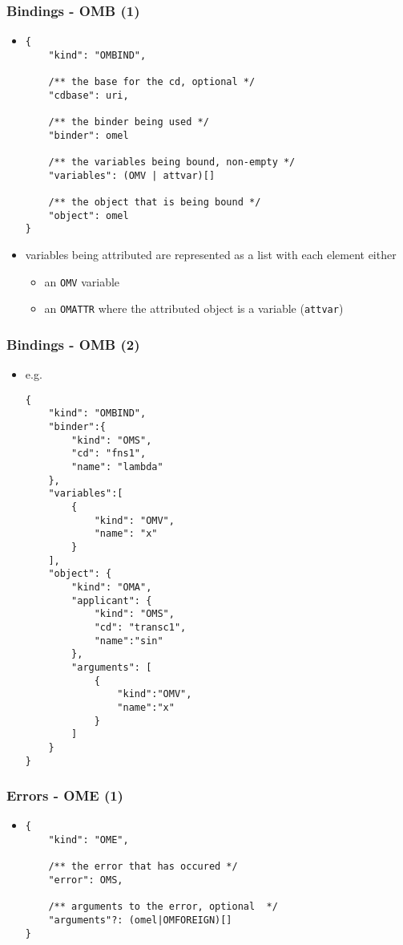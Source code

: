 \documentclass[usenames,dvipsnames]{beamer}
\begin{document}
\begin{frame}[fragile]
    \frametitle{Bindings - OMB (1)}
    \begin{itemize}
        \item
        \begin{lstlisting}
{
    "kind": "OMBIND", 

    /** the base for the cd, optional */
    "cdbase": uri, 

    /** the binder being used */
    "binder": omel

    /** the variables being bound, non-empty */
    "variables": (OMV | attvar)[]

    /** the object that is being bound */
    "object": omel
}
    \end{lstlisting}
        \item variables being attributed are represented as a list with each element either
        \begin{itemize}
            \item an \texttt{OMV} variable
            \item an \texttt{OMATTR} where the attributed object is a variable (\texttt{attvar})
        \end{itemize}
    \end{itemize}
\end{frame}

\begin{frame}[fragile]
    \frametitle{Bindings - OMB (2)}
    \begin{itemize}
        \item e.g.
        \begin{lstlisting}
{  
    "kind": "OMBIND",
    "binder":{  
        "kind": "OMS",
        "cd": "fns1",
        "name": "lambda"
    },
    "variables":[  
        {  
            "kind": "OMV",
            "name": "x"
        }
    ],
    "object": {  
        "kind": "OMA",
        "applicant": {  
            "kind": "OMS",
            "cd": "transc1",
            "name":"sin"
        },
        "arguments": [  
            {  
                "kind":"OMV",
                "name":"x"
            }
        ]
    }
}
\end{lstlisting}
    \end{itemize}
\end{frame}

\begin{frame}[fragile]
    \frametitle{Errors - OME (1)}
    \begin{itemize}
        \item
        \begin{lstlisting}
{
    "kind": "OME", 

    /** the error that has occured */
    "error": OMS,

    /** arguments to the error, optional  */
    "arguments"?: (omel|OMFOREIGN)[]
}
    \end{lstlisting}
    \end{itemize}
\end{frame}
\end{document}
